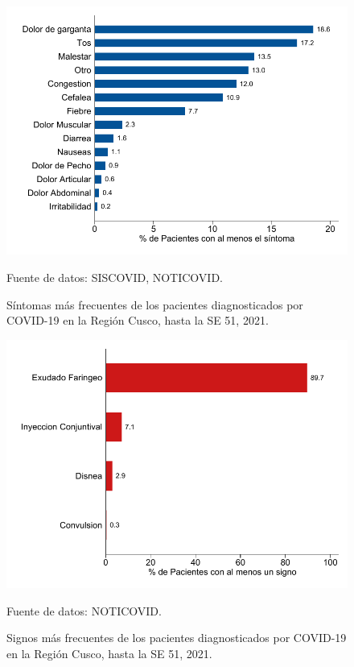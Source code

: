 \documentclass[12pt,a4paper,openany]{book}
\begin{document}
\begin{figure}[h]
	\caption{Síntomas más frecuentes de los pacientes diagnosticados por COVID-19 en la Región Cusco, hasta la SE 51, 2021.  }\label{fig:sintomas}
	\begin{center}
		\includegraphics[width=0.85\linewidth]{../figuras/figura_sintoma.pdf}
	\end{center}
	{\footnotesize {Fuente de datos: SISCOVID, NOTICOVID.}}
\end{figure}

\begin{figure}[h]
	\caption{Signos más frecuentes de los pacientes diagnosticados por COVID-19 en la Región Cusco, hasta la SE 51, 2021.}\label{fig:signos}
	\begin{center}
		\includegraphics[width=0.65\linewidth]{../figuras/figura_signo.pdf}
	\end{center}
	{\footnotesize {Fuente de datos: NOTICOVID.}}
\end{figure}
\end{document}
